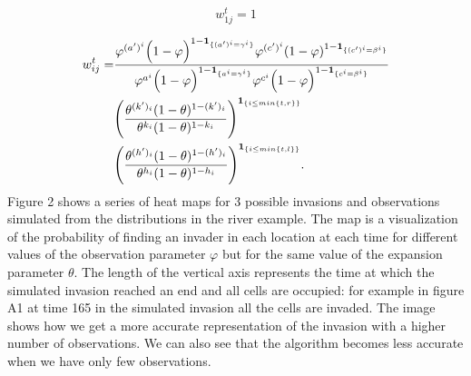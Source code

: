 \begin{equation*}
    w_{1j}^t = 1
\end{equation*}

\begin{align*}
    w_{ij}^t = & \frac{\varphi^{(a')^i} \Big(1-\varphi \Big)^{1-\mathbf{1}_{\{(a')^i = \gamma^i\}}} \varphi^{(c')^i}(1-\varphi)^{1-\mathbf{1}_{\{(c')^i = \beta^i\}}}}{\varphi^{a^i} \Big(1-\varphi \Big)^{1-\mathbf{1}_{\{a^i = \gamma^i\}}} \varphi^{c^i} \Big(1-\varphi \Big)^{1-\mathbf{1}_{\{c^i = \beta^i\}}}} \\ \nonumber
    & \Bigg(\frac{\theta^{(k')_i} (1-\theta )^{1-(k')_i} }{ \theta^{k_i} (1-\theta )^{1-k_i}} \Bigg)^{\mathbf{1}_{\{i \leq min\{ t, r\}\}} } \\ \nonumber
    & \Bigg( \frac{ \theta^{(h')_i} (1-\theta )^{1-(h')_i} }{ \theta^{h_i} (1-\theta )^{1-h_i} } \Bigg)^{\mathbf{1}_{\{i \leq min\{ t, l\}\}}}.
\end{align*}
Figure 2 shows a series of heat maps for 3 possible invasions and observations simulated from the distributions in the river example. The map is a visualization of the probability of finding an invader in each location at each time for different values of the observation parameter $\varphi$ but for the same value of the expansion  parameter $\theta$. The length of the vertical axis represents the time at which the simulated invasion reached an end and all cells are occupied: for example in figure A1 at time 165 in the simulated invasion all the cells are invaded. The image shows how we get a more accurate representation of the invasion with a higher number of observations. We can also see that the algorithm becomes less accurate when we have only few observations.

